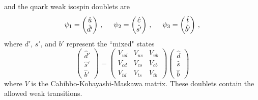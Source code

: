   and the quark weak isospin doublets are
  \begin{equation}
    \psi_{1} = 
    \begin{pmatrix}
        \hat{u} \\
        \hat{d'}
    \end{pmatrix} \,,
      \hspace{5mm}
    \psi_{2} = 
    \begin{pmatrix}
        \hat{c} \\
        \hat{s'}
    \end{pmatrix} \,,
      \hspace{5mm}
    \psi_{3} = 
    \begin{pmatrix}
        \hat{t} \\
        \hat{b'}
    \end{pmatrix} \,,
  \end{equation}
  where $d'$, $s'$, and $b'$ represent the ``mixed" states
  \begin{equation}
      \begin{pmatrix}
        \hat{d}' \\
        \hat{s}' \\
        \hat{b}'
      \end{pmatrix}
      =
      \begin{pmatrix}
          V_{ud} & V_{us} & V_{ub} \\
          V_{cd} & V_{cs} & V_{cb} \\
          V_{td} & V_{ts} & V_{tb}
      \end{pmatrix}
      \begin{pmatrix}
        \hat{d} \\
        \hat{s} \\
        \hat{b}
      \end{pmatrix}
  \end{equation}
  where $V$ is the Cabibbo-Kobayashi-Maskawa matrix. These doublets contain the
  allowed weak transitions.

